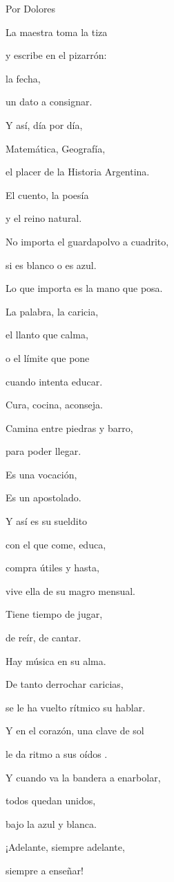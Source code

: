\documentclass[11pt,twoside,openright,a5paper]{book}
\begin{document}
\begin{flushright}Por Dolores\end{flushright}

\begin{center}
La maestra toma la tiza

y escribe en el pizarrón:

la fecha,

un dato a consignar.

Y así, día por día, 

Matemática, Geografía,

el placer de la Historia Argentina.

El cuento, la poesía

y el reino natural.

No importa el guardapolvo a cuadrito,

si es blanco o es azul.

Lo que importa es la mano que posa.

La palabra, la caricia,

el llanto que calma,

o el límite que pone

cuando intenta educar.

Cura, cocina, aconseja.

Camina entre piedras y barro,

para poder llegar.

Es una vocación,

Es un apostolado.

Y así es su sueldito

con el que come, educa,

compra útiles y hasta,

vive ella de su magro mensual.

Tiene tiempo de jugar, 

de reír, de cantar.

Hay música en su alma.

De tanto derrochar caricias,

se le ha vuelto rítmico su hablar.

Y en el corazón, una clave de sol

le da ritmo a sus oídos .

Y cuando va la bandera a enarbolar,

todos quedan unidos,

bajo la azul y blanca.

¡Adelante, siempre adelante,

siempre a enseñar!
\end{center}
\end{document}
